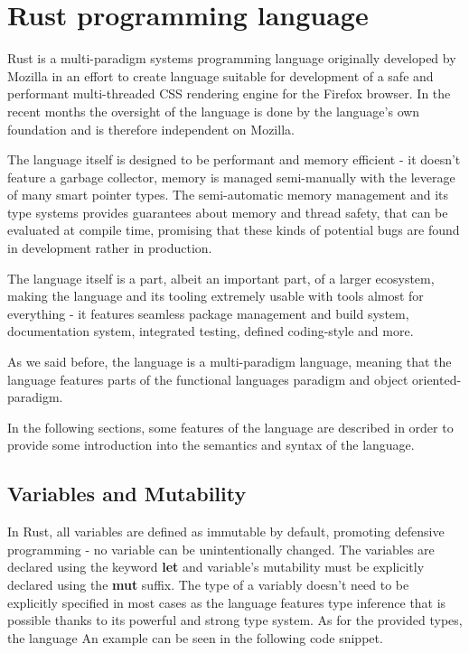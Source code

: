 \section{Rust programming language}
\label{sec:rust}
Rust is a multi-paradigm systems programming language originally developed by Mozilla\cite{rust_authorship} in an effort to create language suitable for development of a safe and performant multi-threaded CSS rendering engine for the Firefox browser\cite{servo}.
In the recent months the oversight of the language is done by the language's own foundation and is therefore independent on Mozilla\cite{rust_foundation}.

The language itself is designed to be performant and memory efficient - it doesn't feature a garbage collector, memory is managed semi-manually with the leverage of many smart pointer types.
The semi-automatic memory management and its type systems provides guarantees about memory and thread safety, that can be evaluated at compile time, promising that these kinds of potential bugs are found in development rather in production.


The language itself is a part, albeit an important part, of a larger ecosystem, making the language and its tooling extremely usable with tools almost for everything - it features seamless package management and build system, documentation system, integrated testing, defined coding-style and more.

As we said before, the language is a multi-paradigm language, meaning that the language features parts of the functional languages paradigm and object oriented-paradigm.


In the following sections, some features of the language are described in order to provide some introduction into the semantics and syntax of the language.
\subsection{Variables and Mutability}
\label{subsec:var_mut}
In Rust, all variables are defined as immutable by default, promoting defensive programming - no variable can be unintentionally changed.
The variables are declared using the keyword \textbf{let} and variable's mutability must be explicitly declared using the \textbf{mut} suffix.
The type of a variably doesn't need to be explicitly specified in most cases as the language features type inference that is possible thanks to its powerful and strong type system.
As for the provided types, the language
An example can be seen in the following code snippet.

